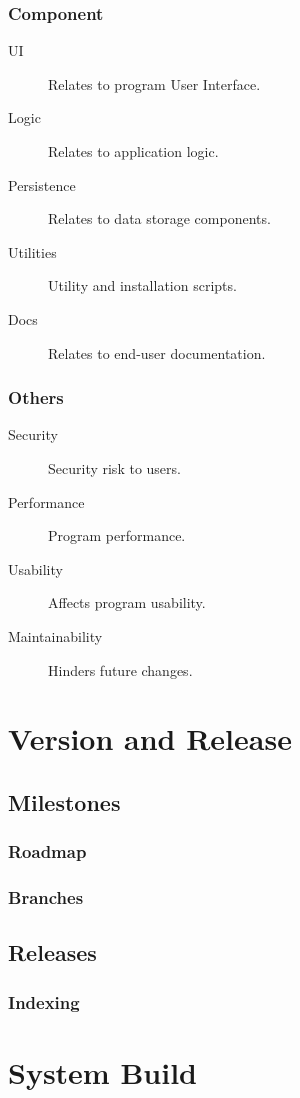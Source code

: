 \documentclass{report}
\begin{document}
\subsection{Component}
\begin{description}
\item[UI]
Relates to program User Interface.
\item[Logic]
Relates to application logic.
\item[Persistence]
Relates to data storage components.
\item[Utilities]
Utility and installation scripts.
\item[Docs]
Relates to end-user documentation.
\end{description}
\subsection{Others}
\begin{description}
\item[Security]
Security risk to users.
\item[Performance]
Program performance.
\item[Usability]
Affects program usability.
\item[Maintainability]
Hinders future changes.
\end{description}

\chapter{Version and Release}
\section{Milestones}
\subsection{Roadmap}
\subsection{Branches}
\section{Releases}
\subsection{Indexing}

\chapter{System Build}
\end{document}
